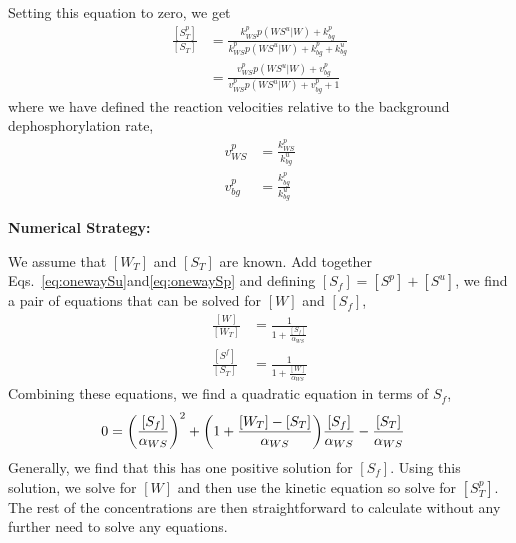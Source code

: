 \documentclass[aps,onecolumn,superscriptaddress,notitlepage]{revtex4-1}
\begin{document}
Setting this equation to zero, we get
\begin{align}
\frac{[S_T^p]}{[S_T]} &= \frac{k_{WS}^p p(WS^u|W) + k_{bg}^p}{k_{WS}^p p(WS^u|W) + k_{bg}^p+k_{bg}^u}\\
& = \frac{v_{WS}^p p(WS^u|W) + v_{bg}^p}{v_{WS}^p p(WS^u|W) + v_{bg}^p+1}
\end{align}
where we have defined the reaction velocities relative to the background dephosphorylation rate,
\begin{align}
v_{WS}^p &= \frac{k_{WS}^p}{k_{bg}^u}\\
v_{bg}^p &= \frac{k_{bg}^p}{k_{bg}^u}
\end{align}

\textbf{Numerical Strategy:}

We assume that  $[W_T]$ and $[S_T]$ are known. 
Add together Eqs.~\eqref{eq:onewaySu}and\eqref{eq:onewaySp} and defining $[S_f] = [S^p]+[S^u]$, 
we find a pair of equations that can be solved for $[W]$ and $[S_f]$,
\begin{align}
\frac{[W]}{[W_T]} & = \frac{1}{1 + \frac{[S_f]}{\alpha_{WS}}}\\
\frac{[S^f]}{[S_T]} &= \frac{1}{1 + \frac{[W]}{\alpha_{WS}}}
\end{align}
Combining these equations, we find a quadratic equation in terms of $S_f$,
\begin{align}
0 &= \qty(\frac{[S_f]}{\alpha_{WS}})^2 +  \qty(1+\frac{[W_T]-[S_T]}{\alpha_{WS}})\frac{[S_f]}{\alpha_{WS}} - \frac{[S_T]}{\alpha_{WS}}
\end{align}
Generally, we find that this has one positive solution for $[S_f]$. 
Using this solution, we solve for $[W]$ and then use the kinetic equation so solve for $[S_T^p]$. The rest of the concentrations are then straightforward to calculate without any further need to solve any equations.
\end{document}
